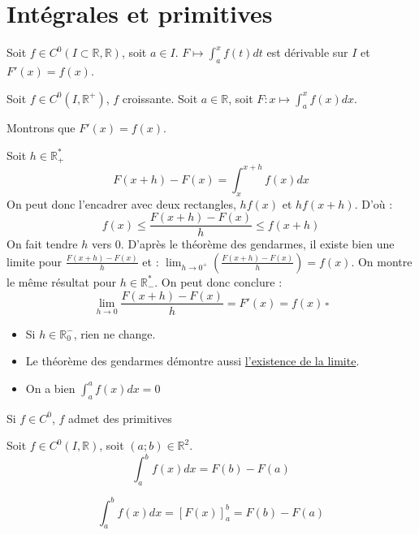 \newpage
\section{Intégrales et primitives}

\begin{theorem}
    Soit \(f \in C^{0}(I \subset \mathbb{R}, \mathbb{R})\), soit \(a \in I\). \(F \longmapsto \int_{a}^{x} f(t) dt\) est dérivable sur \(I\) et \(F'(x) = f(x)\).
\end{theorem}

\begin{explanation}
    Soit \(f \in C^{0}(I, \mathbb{R}^{+})\), \(f\) croissante. Soit \(a \in \mathbb{R}\), soit  \(F : x \mapsto \int_{a}^{x} f(x) dx\). \par
    Montrons que \(F'(x) = f(x)\). \par
    Soit \(h \in \mathbb{R}^{*}_{+}\) 
    \[
        F(x+h) - F(x) = \int_{x}^{x+h} f(x) dx
    \]
    On peut donc l'encadrer avec deux rectangles, \(hf(x)\) et \(hf(x+h)\). D'où : 
    \[
        f(x) \leq \frac{F(x+h) -  F(x)}{h} \leq f(x+h)
    \]   
    On fait tendre \(h\) vers 0. D'après le théorème des gendarmes, il existe bien une limite pour \(\frac{F(x+h) -  F(x)}{h}\) et : 
    \(\lim_{h \to 0^{+}}(\frac{F(x+h) -  F(x)}{h}) = f(x)\). 
    On montre le même résultat pour \(h \in \mathbb{R}^{*}_{-}\). On peut donc conclure : 
    \[
        \lim_{h \to 0} \frac{F(x+h) -  F(x)}{h} = F'(x) = f(x) \,\square
    \]  
\end{explanation}

\begin{remark}[Activité]
    \begin{itemize}
        \item Si \(h \in \mathbb{R}_{0}^{-}\), rien ne change.\par
        \item Le théorème des gendarmes démontre aussi \underline{l'existence de la limite}. 
        \item On a bien \( \int_{a}^{a} f(x) dx =0\) 
    \end{itemize}  
\end{remark}

\begin{corollary}
    Si \(f \in C^{0}\), \(f\) admet des primitives 
\end{corollary}

\begin{corollary}
    Soit \(f \in C^{0}(I, \mathbb{R})\), soit \((a;b) \in \mathbb{R}^{2}\). 
    \[
        \int_{a}^{b} f(x)  dx = F(b)-F(a)
    \]  
    \begin{notation}
        \[
            \int_{a}^{b} f(x) dx = \left[ F(x) \right]^{b}_{a} = F(b)-F(a)
        \]
    \end{notation}
\end{corollary}

